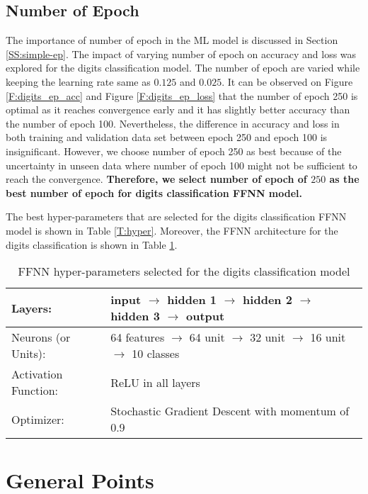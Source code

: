 \documentclass[12pt, a4paper, twoside]{article}
\begin{document}
\subsection{Number of Epoch}\label{SS:digits-ep}
The importance of number of epoch in the ML model is discussed in Section \ref{SS:simple-ep}. The impact of varying number of epoch on accuracy and loss was explored for the digits classification model. The number of epoch are varied while keeping the learning rate same as $0.125$ and $0.025$. It can be observed on Figure \ref{F:digits_ep_acc} and Figure \ref{F:digits_ep_loss} that the number of epoch 250 is optimal as it reaches convergence early and it has slightly better accuracy than the number of epoch 100. Nevertheless, the difference in accuracy and loss in both training and validation data set between epoch 250 and epoch 100 is insignificant. However, we choose number of epoch 250 as best because of the uncertainty in unseen data where number of epoch 100 might not be sufficient to reach the convergence. \textbf{Therefore, we select number of epoch of $250$ as the best number of epoch for digits classification FFNN model.}
\par
The best hyper-parameters that are selected for the digits classification FFNN model is shown in Table \ref{T:hyper}. Moreover, the FFNN architecture for the digits classification is shown in Table \ref{T:digits}.
\begin{table}[ht]
	\begin{center}
		\begin{tabular}{l l}
			\hline
			Layers: & input $\longrightarrow$ hidden 1 $\longrightarrow$ hidden 2 $\longrightarrow$ hidden 3 $\longrightarrow$ output \\ \hline
			Neurons (or Units): & 64 features $\longrightarrow$ 64 unit $\longrightarrow$ 32 unit $\longrightarrow$ 16 unit $\longrightarrow$ 10 classes \\ \hline
			Activation Function: & ReLU in all layers\\ \hline
			Optimizer: & Stochastic Gradient Descent with momentum of 0.9 \\ \hline
		\end{tabular}
		\caption{FFNN hyper-parameters selected for the digits classification  model}\label{T:digits}
	\end{center}
\end{table}
\section{General Points}
\end{document}
